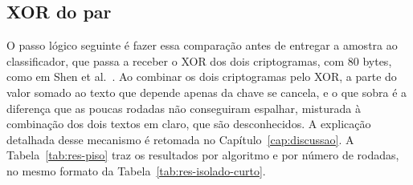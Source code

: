 \subsection{XOR do par}
\label{sec:res-xor}

O passo lógico seguinte é fazer essa comparação antes de entregar a amostra ao classificador, que passa a receber o XOR dos dois criptogramas, com 80 bytes, como em Shen et al.~\cite{Shen2024ND}. Ao combinar os dois criptogramas pelo XOR, a parte do valor somado ao texto que depende apenas da chave se cancela, e o que sobra é a diferença que as poucas rodadas não conseguiram espalhar, misturada à combinação dos dois textos em claro, que são desconhecidos. A explicação detalhada desse mecanismo é retomada no Capítulo~\ref{cap:discussao}. A Tabela~\ref{tab:res-piso} traz os resultados por algoritmo e por número de rodadas, no mesmo formato da Tabela~\ref{tab:res-isolado-curto}.

